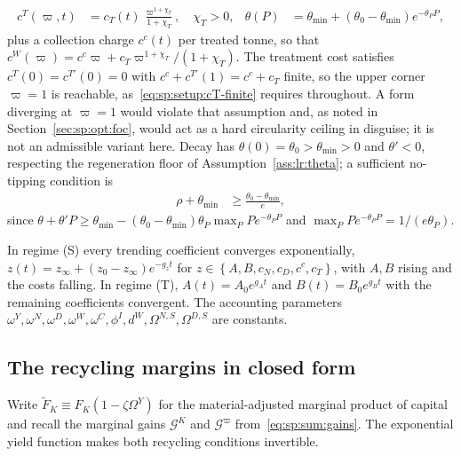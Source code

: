 \begin{align}
c^T\left(\varpi,t\right) &= c_T(t)\,\frac{\varpi^{1+\chi_T}}{1+\chi_T},\quad\chi_T>0,
&
\theta\left(P\right) &= \theta_{\min}+\left(\theta_0-\theta_{\min}\right)e^{-\theta_P P},
\label{eq:app:wh:waste-decay}
\end{align}
plus a collection charge $c^c(t)$ per treated tonne, so that $c^W\left(\varpi\right)=c^c\varpi+c_T\varpi^{1+\chi_T}/\left(1+\chi_T\right)$. The treatment cost satisfies $c^T\left(0\right)=c^{T\prime}\left(0\right)=0$ with $c^c+c^{T\prime}\left(1\right)=c^c+c_T$ finite, so the upper corner $\varpi=1$ is reachable, as~\eqref{eq:sp:setup:cT-finite} requires throughout. A form diverging at $\varpi=1$ would violate that assumption and, as noted in Section~\ref{sec:sp:opt:foc}, would act as a hard circularity ceiling in disguise; it is not an admissible variant here. Decay has $\theta\left(0\right)=\theta_0>\theta_{\min}>0$ and $\theta'<0$, respecting the regeneration floor of Assumption~\ref{ass:lr:theta}; a sufficient no-tipping condition is
\begin{align}
\rho+\theta_{\min} &\ge \frac{\theta_0-\theta_{\min}}{e},
\label{eq:app:wh:notipping}
\end{align}
since $\theta+\theta'P\ge\theta_{\min}-\left(\theta_0-\theta_{\min}\right)\theta_P\max_P Pe^{-\theta_P P}$ and $\max_P Pe^{-\theta_P P}=1/\left(e\theta_P\right)$.

 In regime (S) every trending coefficient converges exponentially, $z(t)=z_\infty+\left(z_0-z_\infty\right)e^{-g_z t}$ for $z\in\left\{A,B,c_N,c_D,c^c,c_T\right\}$, with $A,B$ rising and the costs falling. In regime (T), $A(t)=A_0e^{g_At}$ and $B(t)=B_0e^{g_Bt}$ with the remaining coefficients convergent. The accounting parameters $\omega^Y,\omega^N,\omega^D,\omega^W,\omega^C,\phi^I,d^W,\Omega^{N,S},\Omega^{D,S}$ are constants.

\subsection{The recycling margins in closed form}\label{sec:app:workhorse:margins}

Write $\tilde F_K\equiv F_K\left(1-\zeta\Omega^Y\right)$ for the material-adjusted marginal product of capital and recall the marginal gains $\mathcal G^K$ and $\mathcal G^\varpi$ from~\eqref{eq:sp:sum:gains}. The exponential yield function makes both recycling conditions invertible.

